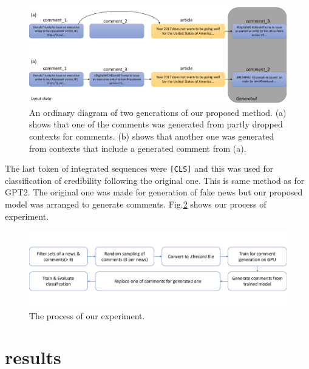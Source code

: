 \documentclass[conference]{IEEEtran}
\begin{document}
\begin{figure}[!t]
    \centering
    \includegraphics[width=\linewidth,pagebox=cropbox,clip]{fig_method.pdf}
    \caption{
        An ordinary diagram of two generations of our proposed method.
        (a) shows that one of the comments was generated from partly dropped contexts for comments.
        (b) shows that another one was generated from contexts that include a generated comment from (a).
    }
    \label{fig:method}
\end{figure}

The last token of integrated sequences were \texttt{[CLS]} and this was used for classification of credibility following the original one.
This is same method as for GPT2\cite{Radford_GPT2}.
The original one was made for generation of fake news but our proposed model was arranged to generate comments.
Fig.\ref{fig:process} shows our process of experiment.

\begin{figure}[!t]
    \centering
    \includegraphics[width=0.8\linewidth,pagebox=cropbox,clip]{fig_process.pdf}
    \caption{The process of our experiment.}
    \label{fig:process}
\end{figure}

\section{results}
\end{document}
